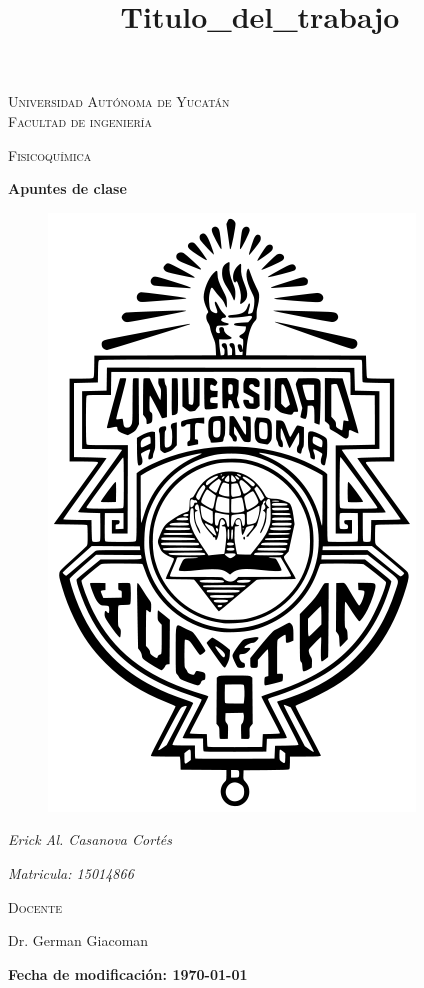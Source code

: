 \documentclass[11pt]{report}
\theoremstyle{plain}
\theoremstyle{definition}
\begin{document}
\begin{titlepage}
\title{Titulo_del_trabajo}


	\centering
	{\scshape\LARGE Universidad Autónoma de Yucatán  \\ Facultad de ingeniería\par}
	\vspace{1cm}
	{\scshape\Large Fisicoquímica\par}
	\vspace{1.5cm}
	{\huge\bfseries Apuntes de clase\par}
	\vspace{0.7cm}
	{\begin{figure}[!h]
	\centering
    \includegraphics[scale=0.3]{UADY.png}
	\end{figure}}
	\vspace{0.7cm}
	{\Large\itshape Erick Al. Casanova Cortés\par}
	{\Large\itshape Matricula: 15014866\par}
	\vfill
	{\scshape\Large Docente\par
	Dr. German Giacoman\par}
	\vfill
	{\Large{\bfseries Fecha de modificación: \today} }

	\vfill
	
\end{titlepage}
\end{document}
